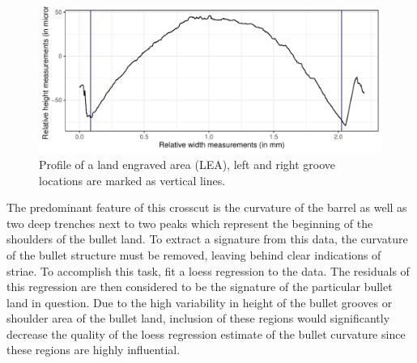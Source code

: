 \documentclass[12pt]{article}\usepackage[]{graphicx}\usepackage[]{color}
\makeatletter
\def\maxwidth{ %
  \ifdim\Gin@nat@width>\linewidth
    \linewidth
  \else
    \Gin@nat@width
  \fi
}
\newenvironment{knitrout}{}{} %
\theoremstyle{nonumberplain}
\makeatother
\begin{document}
\begin{knitrout}
\color{fgcolor}\begin{figure}

{\centering \includegraphics[width=\maxwidth]{figure/r_crosscut-motivation-1} 

}

\caption[Profile of a land engraved area (LEA), left and right groove locations are marked as vertical lines]{Profile of a land engraved area (LEA), left and right groove locations are marked as vertical lines.}\label{fig:r crosscut-motivation}
\end{figure}


\end{knitrout}


The predominant feature of this crosscut is the curvature of the barrel as well as two deep trenches next to two peaks which represent the beginning of the shoulders of the bullet land. To extract a signature from this data, the curvature of the bullet structure must be removed, leaving behind clear indications of striae. To accomplish this task, \cite{hare2017} fit a loess regression to the data. The residuals of this regression are then considered to be the signature of the particular bullet land in question. Due to the high variability in height of the bullet grooves or shoulder area of the bullet land, inclusion of these regions would significantly decrease the quality of the loess regression estimate of the bullet curvature since these regions are highly influential. 
\newpage
\end{document}
